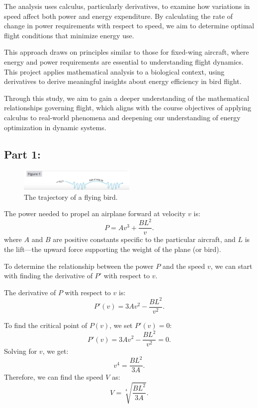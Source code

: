 \documentclass{article}
\begin{document}
The analysis uses calculus, particularly derivatives, to examine how variations in speed affect both power and energy expenditure. By calculating the rate of change in power requirements with respect to speed, we aim to determine optimal flight conditions that minimize energy use.

This approach draws on principles similar to those for fixed-wing aircraft, where energy and power requirements are essential to understanding flight dynamics. This project applies mathematical analysis to a biological context, using derivatives to derive meaningful insights about energy efficiency in bird flight.

Through this study, we aim to gain a deeper understanding of the mathematical relationships governing flight, which aligns with the course objectives of applying calculus to real-world phenomena and deepening our understanding of energy optimization in dynamic systems.
\newpage


\subsection*{Part 1:}
\begin{figure}[h]
    \centering
    \includegraphics[width=0.5\textwidth]{bird.png}
    \caption{\small The trajectory of a flying bird.}
    \label{fig:bird}
\end{figure}

The power needed to propel an airplane forward at velocity \( v \) is: 
\[
P = Av^3 + \frac{BL^2}{v}.
\]
where \( A \) and \( B \) are positive constants specific to the particular aircraft, and \( L \) is the lift—the upward force supporting the weight of the plane (or bird).
\setlength{\parskip}{2em}

To determine the relationship between the power \(P\) and the speed \(v\), we can start with finding the derivative of \(P'\) with respect to \(v\).

The derivative of \( P \) with respect to \( v \) is:
\[
P'(v) = 3Av^2 - \frac{BL^2}{v^2}.
\]

To find the critical point of \( P(v) \), we set \( P'(v) = 0 \):
\[
P'(v) = 3Av^2 - \frac{BL^2}{v^2} = 0.
\]
Solving for \( v \), we get:
\[
v^4 = \frac{BL^2}{3A}.
\]
Therefore, we can find the speed \( V \) as:
\[
V = \sqrt[4]{\frac{BL^2}{3A}}.
\]
\end{document}

